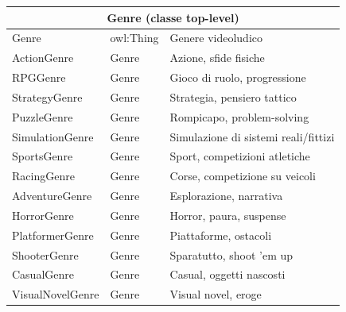 \begin{longtable}{llp{5cm}}
\multicolumn{3}{c}{\textbf{Genre (classe top-level)}} \\
\midrule
Genre               & owl:Thing       & Genere videoludico \\
ActionGenre         & Genre           & Azione, sfide fisiche \\
RPGGenre            & Genre           & Gioco di ruolo, progressione \\
StrategyGenre       & Genre           & Strategia, pensiero tattico \\
PuzzleGenre         & Genre           & Rompicapo, problem-solving \\
SimulationGenre     & Genre           & Simulazione di sistemi reali/fittizi \\
SportsGenre         & Genre           & Sport, competizioni atletiche \\
RacingGenre         & Genre           & Corse, competizione su veicoli \\
AdventureGenre      & Genre           & Esplorazione, narrativa \\
HorrorGenre         & Genre           & Horror, paura, suspense \\
PlatformerGenre     & Genre           & Piattaforme, ostacoli \\
ShooterGenre        & Genre           & Sparatutto, shoot 'em up \\
CasualGenre         & Genre           & Casual, oggetti nascosti \\
VisualNovelGenre    & Genre           & Visual novel, eroge \\
\midrule


\end{longtable}
